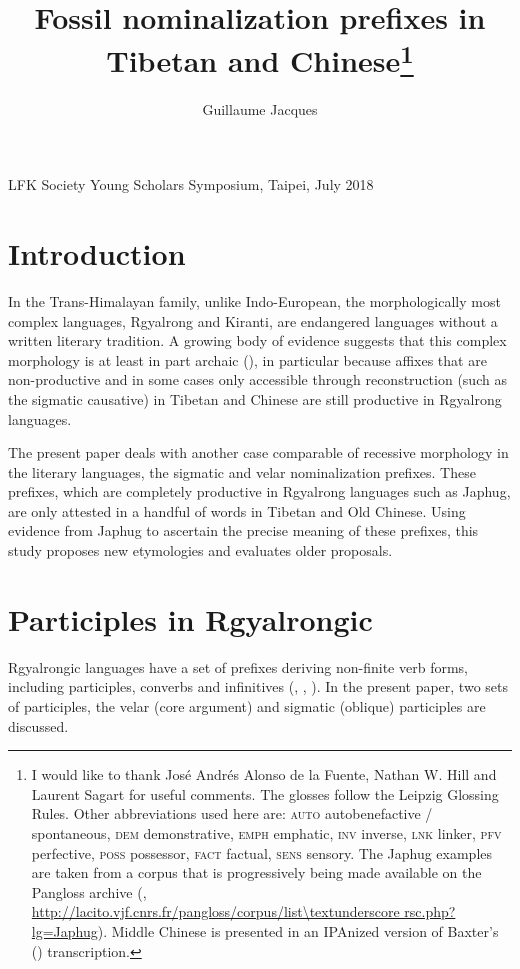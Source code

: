 \documentclass[oneside,a4paper,11pt]{article}
\begin{document}
\title{Fossil nominalization prefixes in Tibetan and Chinese\footnote{I would like to thank José Andrés Alonso de la Fuente, Nathan W. Hill and Laurent Sagart for useful comments. The glosses follow the Leipzig Glossing Rules. Other abbreviations used here are:  \textsc{auto} autobenefactive / spontaneous,  \textsc{dem} demonstrative,  \textsc{emph} emphatic, \textsc{inv} inverse,  \textsc{lnk} linker, \textsc{pfv} perfective, \textsc{poss} possessor, \textsc{fact} factual,  \textsc{sens} sensory. The Japhug examples are taken from a corpus that is progressively being made available on the Pangloss archive (\citealt{michailovsky14pangloss},  
 \url{http://lacito.vjf.cnrs.fr/pangloss/corpus/list\textunderscore rsc.php?lg=Japhug}). Middle Chinese is presented in an IPAnized version of Baxter's (\citeyear{baxter92}) transcription.}}
\author{Guillaume Jacques}
\maketitle
LFK Society Young Scholars Symposium, Taipei, July 2018
\section{Introduction}
  In the Trans-Himalayan family, unlike Indo-European, the morphologically most complex languages, Rgyalrong and Kiranti, are endangered languages without a written literary tradition. A growing body of evidence suggests that this complex morphology is at least in part archaic (\citealt{jacques12agreement, delancey14second, jacques16ssuffixes, gong17xingtaixue}), in particular because affixes that are non-productive and in some cases only accessible through reconstruction (such as the sigmatic causative) in Tibetan and Chinese are still productive in Rgyalrong languages.

The present paper deals with another case comparable of recessive morphology in the literary languages, the sigmatic and velar nominalization prefixes. These prefixes, which are completely productive in Rgyalrong languages such as Japhug, are only attested in a handful of words in Tibetan and Old Chinese. Using evidence from Japhug to ascertain the precise meaning of these prefixes, this study proposes new etymologies and evaluates older proposals.

\section{Participles in Rgyalrongic}
Rgyalrongic languages have a set of prefixes deriving non-finite verb forms, including participles, converbs and infinitives (\citealt{jacques14linking}, \citealt{jackson14morpho}, \citealt{jacques16relatives}). In the present paper, two sets of participles, the velar (core argument) and sigmatic (oblique) participles are discussed.
\end{document}
